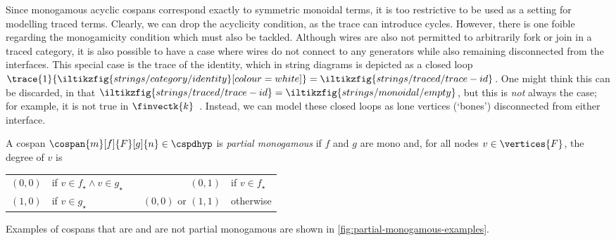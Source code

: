 Since monogamous acyclic cospans correspond exactly to symmetric monoidal terms,
it is too restrictive to be used as a setting for modelling traced terms.
Clearly, we can drop the acyclicity condition, as the trace can introduce
cycles.
However, there is one foible regarding the monogamicity condition which must
also be tackled.
Although wires are also not permitted to arbitrarily fork or join in a traced
category, it is also possible to have a case where wires do not connect to
any generators while also remaining disconnected from the interfaces.
This special case is the trace of the identity, which in string diagrams is
depicted as a closed
loop \(
    \trace{1}{\iltikzfig{strings/category/identity}[colour=white]}
    =
    \iltikzfig{strings/traced/trace-id}
\).
One might think this can be discarded, in that \(
    \iltikzfig{strings/traced/trace-id}
    =
    \iltikzfig{strings/monoidal/empty}
\), but this is \emph{not} always the case; for example, it is not true
in \(\finvectk{k}\)~\cite[Sec. 6.1]{hasegawa1997recursion}.
Instead, we can model these closed loops as lone vertices (`bones') disconnected
from either interface.

\begin{definition}
    A cospan \(\cospan{m}[f]{F}[g]{n} \in \cspdhyp\) is
    \emph{partial monogamous} if \(f\) and \(g\) are mono and, for all nodes
    \(v \in \vertices{F}\), the degree of \(v\) is
    \begin{center}
        \begin{tabular}{rlcrl}
            \((0,0)\)
            &
            if \(v \in f_\star \wedge v \in g_\star\)
            &
            \quad
            &
            \((0,1)\)
            &
            if \(v \in f_\star\)
            \\
            \((1,0)\)
            &
            if \(v \in g_\star\)
            &
            \quad
            &
            \((0,0)\)
            or \((1,1)\)
            &
            otherwise
        \end{tabular}
    \end{center}
\end{definition}



\begin{example}
    Examples of cospans that are and are not partial monogamous are shown
    in \cref{fig:partial-monogamous-examples}.
\end{example}

